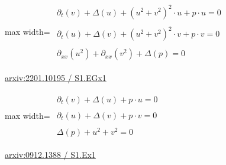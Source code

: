 \documentclass[UTF8,10pt,a4paper,fontset=mac]{ctexart}
\begin{document}
\begin{minipage}{\linewidth}\begin{center}\begin{adjustbox}{max width=\linewidth}$\displaystyle\begin{gathered}\begin{gathered}\partial_{t}(v)+\Delta(u)+(u^{2}+v^{2})^{2}\cdot u+p\cdot u=0\end{gathered}\\[5pt]\begin{gathered}\partial_{t}(u)+\Delta(v)+(u^{2}+v^{2})^{2}\cdot v+p\cdot v=0\end{gathered}\\[5pt]\begin{gathered}\partial_{xx}(u^{2})+\partial_{xx}(v^{2})+\Delta(p)=0\end{gathered}\end{gathered}$\end{adjustbox}\end{center}{\small\href{https://arxiv.org/html/2201.10195#S1.EGx1}{arxiv:2201.10195 / S1.EGx1}}\par\end{minipage}\par\vspace{6mm}

\begin{minipage}{\linewidth}\begin{center}\begin{adjustbox}{max width=\linewidth}$\displaystyle\begin{gathered}\begin{gathered}\partial_{t}(v)+\Delta(u)+p\cdot u=0\end{gathered}\\[5pt]\begin{gathered}\partial_{t}(u)+\Delta(v)+p\cdot v=0\end{gathered}\\[5pt]\begin{gathered}\Delta(p)+u^{2}+v^{2}=0\end{gathered}\end{gathered}$\end{adjustbox}\end{center}{\small\href{https://arxiv.org/html/0912.1388#S1.Ex1}{arxiv:0912.1388 / S1.Ex1}}\par\end{minipage}\par\vspace{6mm}
\end{document}
